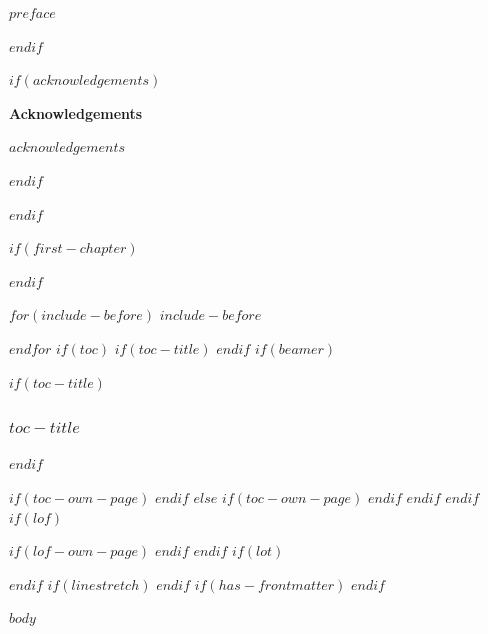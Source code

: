 \documentclass[12pt]{article}
\begin{document}
\begin{justify}
$preface$
\end{justify}
\pagebreak
$endif$

$if(acknowledgements)$
\begin{center}
 {\LARGE \textbf{\textsf{Acknowledgements}}}
\end{center}

\begin{justify}
$acknowledgements$
\end{justify}
\pagebreak
$endif$

$endif$
\setcounter{page}{0}

$if(first-chapter)$
\setcounter{chapter}{$first-chapter$}
\addtocounter{chapter}{-1}
$endif$

$for(include-before)$
$include-before$

$endfor$
$if(toc)$
$if(toc-title)$
\renewcommand*\contentsname{$toc-title$}
$endif$
$if(beamer)$
\begin{frame}[allowframebreaks]
$if(toc-title)$
  \frametitle{$toc-title$}
$endif$
  \tableofcontents[hideallsubsections]
\end{frame}
$if(toc-own-page)$
\newpage
$endif$
$else$
{
\setcounter{tocdepth}{$toc-depth$}
\tableofcontents
$if(toc-own-page)$
\newpage
$endif$
}
$endif$
$endif$
$if(lof)$
\listoffigures
$if(lof-own-page)$
\newpage
$endif$
$endif$
$if(lot)$
\listoftables
$endif$
$if(linestretch)$
$endif$
$if(has-frontmatter)$
\mainmatter
$endif$

\setlength{\parskip}{1em}

$body$
\end{document}
